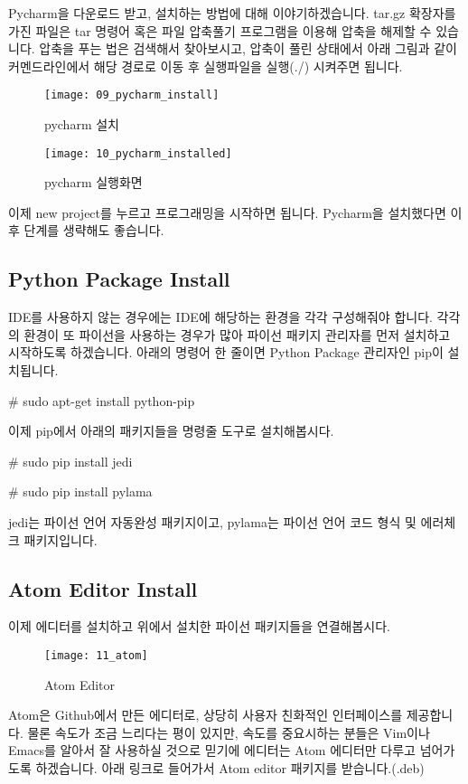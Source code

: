 \documentclass[11pt,fleqn]{book} %
\begin{document}
Pycharm을 다운로드 받고, 설치하는 방법에 대해 이야기하겠습니다. tar.gz 확장자를 가진 파일은 tar 명령어 혹은 파일 압축풀기 프로그램을 이용해 압축을 해제할 수 있습니다.
압축을 푸는 법은 검색해서 찾아보시고, 압축이 풀린 상태에서 아래 그림과 같이 커멘드라인에서 해당 경로로 이동 후 실행파일을 실행(./) 시켜주면 됩니다.

\begin{figure}[h]
\centering\texttt{[image: 09\_pycharm\_install]}
\caption{pycharm 설치}
\end{figure}

\begin{figure}[h]
\centering\texttt{[image: 10\_pycharm\_installed]}
\caption{pycharm 실행화면}
\end{figure}

이제 new project를 누르고 프로그래밍을 시작하면 됩니다. Pycharm을 설치했다면 이후 단계를 생략해도 좋습니다.

\subsection{Python Package Install}

IDE를 사용하지 않는 경우에는 IDE에 해당하는 환경을 각각 구성해줘야 합니다. 각각의 환경이 또 파이선을 사용하는 경우가 많아 파이선 패키지 관리자를 먼저 설치하고 시작하도록 하겠습니다.
아래의 명령어 한 줄이면 Python Package 관리자인 pip이 설치됩니다.

\# sudo apt-get install python-pip

이제 pip에서 아래의 패키지들을 명령줄 도구로 설치해봅시다.

\# sudo pip install jedi

\# sudo pip install pylama

jedi는 파이선 언어 자동완성 패키지이고, pylama는 파이선 언어 코드 형식 및 에러체크 패키지입니다.

\subsection{Atom Editor Install}

이제 에디터를 설치하고 위에서 설치한 파이선 패키지들을 연결해봅시다.

\begin{figure}[h]
\centering\texttt{[image: 11\_atom]}
\caption{Atom Editor}
\end{figure}

Atom은 Github에서 만든 에디터로, 상당히 사용자 친화적인 인터페이스를 제공합니다.
물론 속도가 조금 느리다는 평이 있지만, 속도를 중요시하는 분들은 Vim이나 Emacs를 알아서 잘 사용하실 것으로 믿기에 에디터는 Atom 에디터만 다루고 넘어가도록 하겠습니다.
아래 링크로 들어가서 Atom editor 패키지를 받습니다.(.deb)
\end{document}
